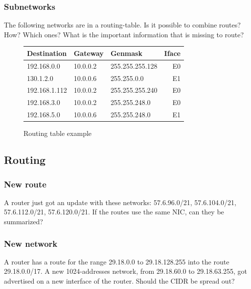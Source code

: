\documentclass[11pt]{article}
\begin{document}
\subsubsection{Subnetworks}
The following networks are in a routing-table. Is it possible to combine routes? How? Which ones? What is the important information that is missing to route? %
\begin{figure}[h]
  \centering
  \resizebox{10cm}{!} {
    \begin{tabular}{lllr}
      \textbf{Destination} & \textbf{Gateway} & \textbf{Genmask} & \textbf{Iface} \\ \hline
      192.168.0.0   & 10.0.0.2 & 255.255.255.128 & E0 \\
      130.1.2.0     & 10.0.0.6 & 255.255.0.0     & E1 \\
      192.168.1.112 & 10.0.0.2 & 255.255.255.240 & E0 \\
      192.168.3.0   & 10.0.0.2 & 255.255.248.0   & E0 \\
      192.168.5.0   & 10.0.0.6 & 255.255.248.0   & E1 \\
    \end{tabular}
  }
  \caption{Routing table example}
  \label{fig:rting-tbl}
\end{figure}
\subsection{Routing}
\subsubsection{New route}
A router just got an update with these networks: 57.6.96.0/21, 57.6.104.0/21, 57.6.112.0/21, 57.6.120.0/21. If the routes use the same NIC, can they be summarized? %
\subsubsection{New network}
A router has a route for the range 29.18.0.0 to 29.18.128.255 into the route 29.18.0.0/17. A new 1024-addresses network, from 29.18.60.0 to 29.18.63.255, got advertised on a new interface of the router. Should the CIDR be spread out? %
\end{document}
